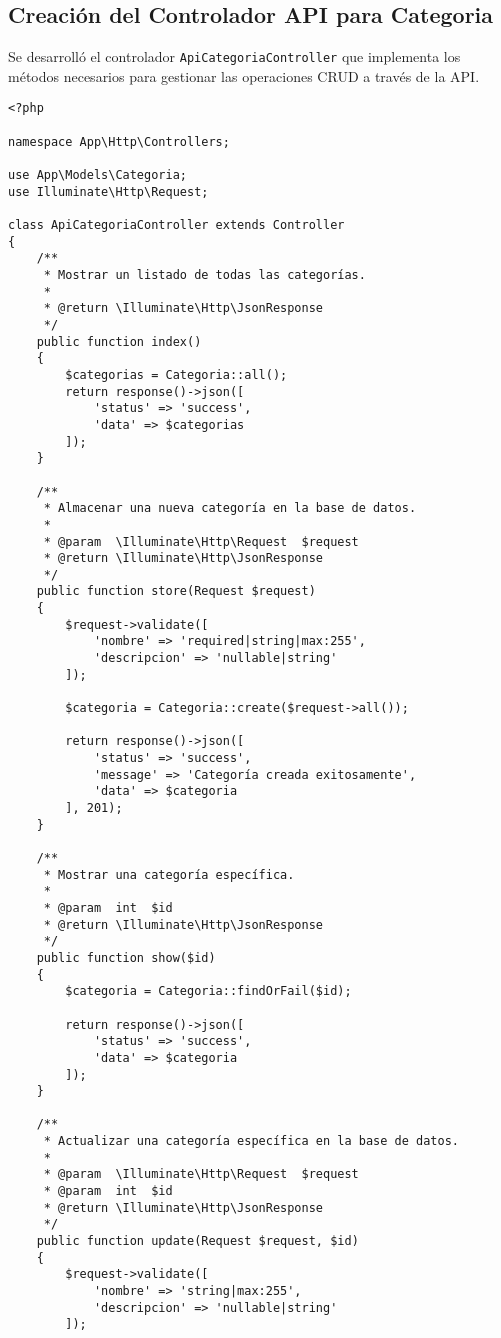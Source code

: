 \documentclass{article}
\begin{document}
\subsection{Creación del Controlador API para Categoria}

Se desarrolló el controlador \texttt{ApiCategoriaController} que implementa los métodos necesarios para gestionar las operaciones CRUD a través de la API.

\begin{lstlisting}[language=laravelPHP, caption=ApiCategoriaController]
<?php

namespace App\Http\Controllers;

use App\Models\Categoria;
use Illuminate\Http\Request;

class ApiCategoriaController extends Controller
{
    /**
     * Mostrar un listado de todas las categorías.
     *
     * @return \Illuminate\Http\JsonResponse
     */
    public function index()
    {
        $categorias = Categoria::all();
        return response()->json([
            'status' => 'success',
            'data' => $categorias
        ]);
    }

    /**
     * Almacenar una nueva categoría en la base de datos.
     *
     * @param  \Illuminate\Http\Request  $request
     * @return \Illuminate\Http\JsonResponse
     */
    public function store(Request $request)
    {
        $request->validate([
            'nombre' => 'required|string|max:255',
            'descripcion' => 'nullable|string'
        ]);

        $categoria = Categoria::create($request->all());
        
        return response()->json([
            'status' => 'success',
            'message' => 'Categoría creada exitosamente',
            'data' => $categoria
        ], 201);
    }

    /**
     * Mostrar una categoría específica.
     *
     * @param  int  $id
     * @return \Illuminate\Http\JsonResponse
     */
    public function show($id)
    {
        $categoria = Categoria::findOrFail($id);
        
        return response()->json([
            'status' => 'success',
            'data' => $categoria
        ]);
    }

    /**
     * Actualizar una categoría específica en la base de datos.
     *
     * @param  \Illuminate\Http\Request  $request
     * @param  int  $id
     * @return \Illuminate\Http\JsonResponse
     */
    public function update(Request $request, $id)
    {
        $request->validate([
            'nombre' => 'string|max:255',
            'descripcion' => 'nullable|string'
        ]);


\end{lstlisting}
\end{document}
